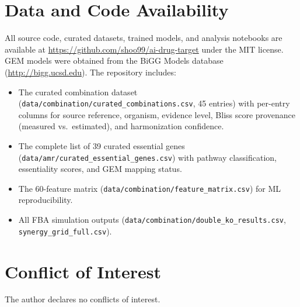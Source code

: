 \documentclass[12pt,a4paper]{article}
\begin{document}
\section*{Data and Code Availability}

All source code, curated datasets, trained models, and analysis notebooks are available at \url{https://github.com/shoo99/ai-drug-target} under the MIT license. GEM models were obtained from the BiGG Models database (\url{http://bigg.ucsd.edu}). The repository includes:
\begin{itemize}
    \item The curated combination dataset (\texttt{data/combination/curated\_combinations.csv}, 45 entries) with per-entry columns for source reference, organism, evidence level, Bliss score provenance (measured vs.\ estimated), and harmonization confidence.
    \item The complete list of 39 curated essential genes (\texttt{data/amr/curated\_essential\_genes.csv}) with pathway classification, essentiality scores, and GEM mapping status.
    \item The 60-feature matrix (\texttt{data/combination/feature\_matrix.csv}) for ML reproducibility.
    \item All FBA simulation outputs (\texttt{data/combination/double\_ko\_results.csv}, \texttt{synergy\_grid\_full.csv}).
\end{itemize}

\section*{Conflict of Interest}

The author declares no conflicts of interest.



\end{document}
